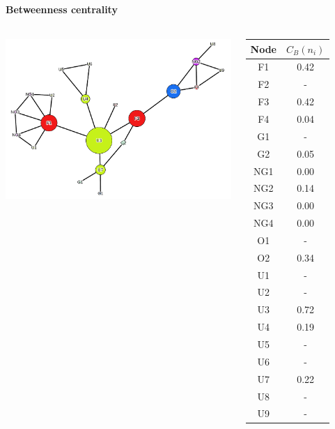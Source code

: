 \documentclass[8pt]{beamer}
\begin{document}

\begin{frame}
\frametitle{\insertsection}
\framesubtitle{Betweenness centrality}

\begin{columns}[c]
    \includegraphics[width=\linewidth,height=\textheight,keepaspectratio]{exercise_betweenness_gephi}

\centering
\scriptsize
\begin{table}
\centering
\begin{tabular}{cc}
\bottomrule 
Node & $C_{B}(n_{i})$ \\
\hline
F1   & 0.42        \\
F2   & -           \\
F3   & 0.42        \\
F4   & 0.04        \\
G1   & -           \\
G2   & 0.05        \\
NG1  & 0.00           \\
NG2  & 0.14        \\
NG3  & 0.00           \\
NG4  & 0.00           \\
O1   & -           \\
O2   & 0.34        \\
U1   & -           \\
U2   & -           \\
U3   & 0.72        \\
U4   & 0.19        \\
U5   & -           \\
U6   & -           \\
U7   & 0.22        \\
U8   & -           \\
U9   & -          \\
\bottomrule   
\end{tabular}
\end{table}
\end{columns}
   
\end{frame}
\end{document}
